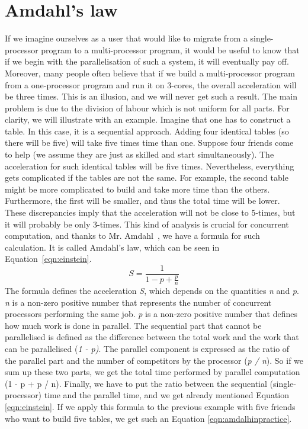 \section{Amdahl's law}
\label{04:amdalhlaw}

If we imagine ourselves as a user that would like to migrate from a single-processor program to a multi-processor program, it would be useful to know that if we begin with the parallelisation of such a system, it will eventually pay off.
Moreover, many people often believe that if we build a multi-processor program from a one-processor program and run it on 3-cores, the overall acceleration will be three times.
This is an illusion, and we will never get such a result.
The main problem is due to the division of labour which is not uniform for all parts.
For clarity, we will illustrate with an example.
Imagine that one has to construct a table.
In this case, it is a sequential approach.
Adding four identical tables (so there will be five) will take five times time than one.
Suppose four friends come to help (we assume they are just as skilled and start simultaneously).
The acceleration for such identical tables will be five times.
Nevertheless, everything gets complicated if the tables are not the same.
For example, the second table might be more complicated to build and take more time than the others.
Furthermore, the first will be smaller, and thus the total time will be lower.
These discrepancies imply that the acceleration will not be close to 5-times, but it will probably be only 3-times.
This kind of analysis is crucial for concurrent computation, and thanks to Mr. Amdahl~\cite{amdalh}, we have a formula for such calculation.
It is called Amdahl's law, which can be seen in Equation~\eqref{eqn:einstein}.
\begin{equation}
    \label{eqn:einstein}
    S = \frac{1}{1 - p + \frac{p}{n}}
    \tag{1}
\end{equation}
The formula defines the acceleration \emph{S}, which depends on the quantities \emph{n} and \emph{p}. \emph{n} is a non-zero positive number that represents the number of concurrent processors performing the same job. \emph{p} is a non-zero positive number that defines how much work is done in parallel.
The sequential part that cannot be parallelised is defined as the difference between the total work and the work that can be parallelised (\emph{1 - p)}. The parallel component is expressed as the ratio of the parallel part and the number of competitors by the processor (\emph{p / n}).
So if we sum up these two parts, we get the total time performed by parallel computation ({1 - p + p / n}). Finally, we have to put the ratio between the sequential (single-processor) time and the parallel time, and we get already mentioned Equation \ref{eqn:einstein}.
If we apply this formula to the previous example with five friends who want to build five tables, we get such an Equation \eqref{eqn:amdalhinpractice}.

